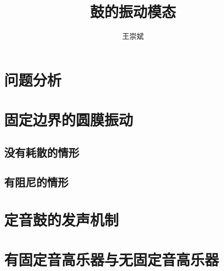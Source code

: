 \documentclass[a4paper]{ctexart}
\title{\textbf{鼓的振动模态}}
\author{王崇斌\;1800011716}
\date{}
\begin{document}
	\pagestyle{fancy}
	\pagestyle{fancy}
	\chead{}
	\rhead{\today}
	\maketitle
	\thispagestyle{fancy}
	\section{问题分析}
	\section{固定边界的圆膜振动}
	\subsection{没有耗散的情形}
	\subsection{有阻尼的情形}
	\section{定音鼓的发声机制}
	\section{有固定音高乐器与无固定音高乐器}
\end{document}
